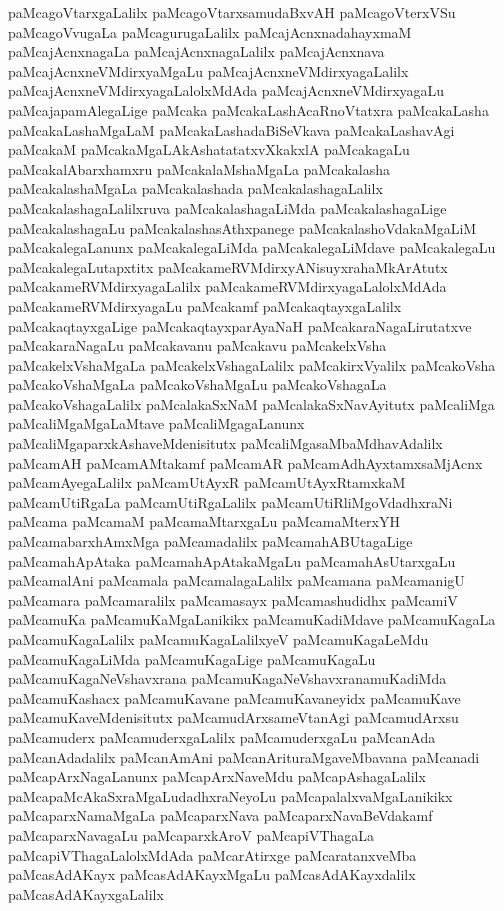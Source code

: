 {paMcagoVtarxgaLalilx
paMcagoVtarxsamudaBxvAH
paMcagoVterxVSu
paMcagoVvugaLa
paMcagurugaLalilx
paMcajAcnxnadahayxmaM
paMcajAcnxnagaLa
paMcajAcnxnagaLalilx
paMcajAcnxnava
paMcajAcnxneVMdirxyaMgaLu
paMcajAcnxneVMdirxyagaLalilx
paMcajAcnxneVMdirxyagaLalolxMdAda
paMcajAcnxneVMdirxyagaLu
paMcajapamAlegaLige
paMcaka
paMcakaLashAcaRnoVtatxra
paMcakaLasha
paMcakaLashaMgaLaM
paMcakaLashadaBiSeVkava
paMcakaLashavAgi
paMcakaM
paMcakaMgaLAkAshatatatxvXkakxlA
paMcakagaLu
paMcakalAbarxhamxru
paMcakalaMshaMgaLa
paMcakalasha
paMcakalashaMgaLa
paMcakalashada
paMcakalashagaLalilx
paMcakalashagaLalilxruva
paMcakalashagaLiMda
paMcakalashagaLige
paMcakalashagaLu
paMcakalashasAthxpanege
paMcakalashoVdakaMgaLiM
paMcakalegaLanunx
paMcakalegaLiMda
paMcakalegaLiMdave
paMcakalegaLu
paMcakalegaLutapxtitx
paMcakameRVMdirxyANisuyxrahaMkArAtutx
paMcakameRVMdirxyagaLalilx
paMcakameRVMdirxyagaLalolxMdAda
paMcakameRVMdirxyagaLu
paMcakamf
paMcakaqtayxgaLalilx
paMcakaqtayxgaLige
paMcakaqtayxparAyaNaH
paMcakaraNagaLirutatxve
paMcakaraNagaLu
paMcakavanu
paMcakavu
paMcakelxVsha
paMcakelxVshaMgaLa
paMcakelxVshagaLalilx
paMcakirxVyalilx
paMcakoVsha
paMcakoVshaMgaLa
paMcakoVshaMgaLu
paMcakoVshagaLa
paMcakoVshagaLalilx
paMcalakaSxNaM
paMcalakaSxNavAyitutx
paMcaliMga
paMcaliMgaMgaLaMtave
paMcaliMgagaLanunx
paMcaliMgaparxkAshaveMdenisitutx
paMcaliMgasaMbaMdhavAdalilx
paMcamAH
paMcamAMtakamf
paMcamAR
paMcamAdhAyxtamxsaMjAcnx
paMcamAyegaLalilx
paMcamUtAyxR
paMcamUtAyxRtamxkaM
paMcamUtiRgaLa
paMcamUtiRgaLalilx
paMcamUtiRliMgoVdadhxraNi
paMcama
paMcamaM
paMcamaMtarxgaLu
paMcamaMterxYH
paMcamabarxhAmxMga
paMcamadalilx
paMcamahABUtagaLige
paMcamahApAtaka
paMcamahApAtakaMgaLu
paMcamahAsUtarxgaLu
paMcamalAni
paMcamala
paMcamalagaLalilx
paMcamana
paMcamanigU
paMcamara
paMcamaralilx
paMcamasayx
paMcamashudidhx
paMcamiV
paMcamuKa
paMcamuKaMgaLanikikx
paMcamuKadiMdave
paMcamuKagaLa
paMcamuKagaLalilx
paMcamuKagaLalilxyeV
paMcamuKagaLeMdu
paMcamuKagaLiMda
paMcamuKagaLige
paMcamuKagaLu
paMcamuKagaNeVshavxrana
paMcamuKagaNeVshavxranamuKadiMda
paMcamuKashacx
paMcamuKavane
paMcamuKavaneyidx
paMcamuKave
paMcamuKaveMdenisitutx
paMcamudArxsameVtanAgi
paMcamudArxsu
paMcamuderx
paMcamuderxgaLalilx
paMcamuderxgaLu
paMcanAda
paMcanAdadalilx
paMcanAmAni
paMcanArituraMgaveMbavana
paMcanadi
paMcapArxNagaLanunx
paMcapArxNaveMdu
paMcapAshagaLalilx
paMcapaMcAkaSxraMgaLudadhxraNeyoLu
paMcapalalxvaMgaLanikikx
paMcaparxNamaMgaLa
paMcaparxNava
paMcaparxNavaBeVdakamf
paMcaparxNavagaLu
paMcaparxkAroV
paMcapiVThagaLa
paMcapiVThagaLalolxMdAda
paMcarAtirxge
paMcaratanxveMba
paMcasAdAKayx
paMcasAdAKayxMgaLu
paMcasAdAKayxdalilx
paMcasAdAKayxgaLalilx
}
